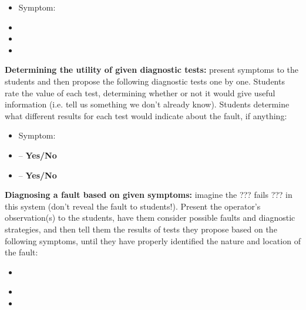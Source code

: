 \begin{itemize}
\item{} Symptom: {\it }
\item{} 
\item{} 
\item{} 
\end{itemize}


\vskip 10pt


\noindent
{\bf Determining the utility of given diagnostic tests:} present symptoms to the students and then propose the following diagnostic tests one by one.  Students rate the value of each test, determining whether or not it would give useful information (i.e. tell us something we don't already know).  Students determine what different results for each test would indicate about the fault, if anything:

\begin{itemize}
\item{} Symptom: {\it }
\item{}  -- {\bf Yes/No}
\item{}  -- {\bf Yes/No}
\end{itemize}


\vskip 10pt


\noindent
{\bf Diagnosing a fault based on given symptoms:} imagine the ??? fails ??? in this system (don't reveal the fault to students!).  Present the operator's observation(s) to the students, have them consider possible faults and diagnostic strategies, and then tell them the results of tests they propose based on the following symptoms, until they have properly identified the nature and location of the fault:

\begin{itemize}
\item{} {\it }
\item{} 
\item{} 
\end{itemize}


